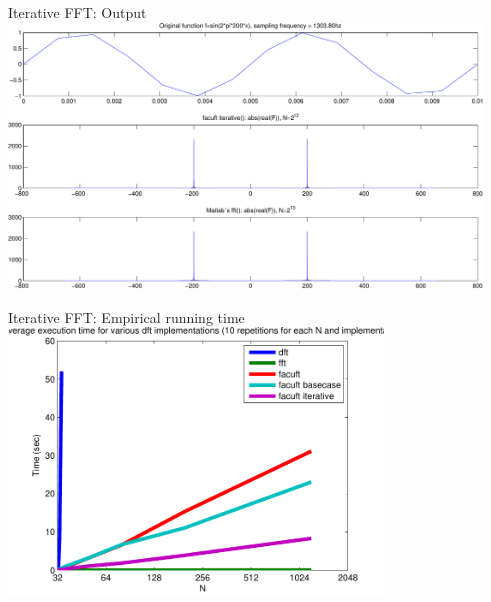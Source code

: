\begin{myframe}{Iterative FFT: Output}
\centering
\includegraphics[height=200pt]{img/facuft_iterative}
\end{myframe}

\begin{myframe}{Iterative FFT: Empirical running time}
\centering
\includegraphics[height=200pt]{img/running_time_iterative}
\end{myframe}